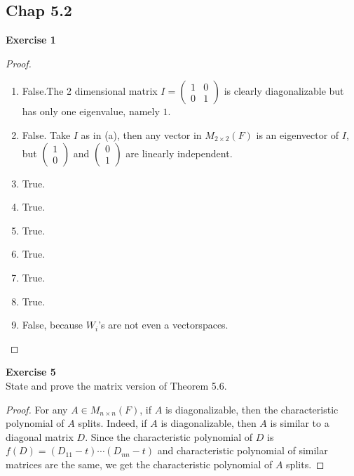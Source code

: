 \documentclass[12pt, a4paper]{article}
\theoremstyle{plain}
\newenvironment{exercise}[2][Exercise]
    { \begin{mdframed}[backgroundcolor=gray!20] \textbf{#1 #2} \\}
    {  \end{mdframed}}
\begin{document}
\pagebreak

\subsection*{Chap 5.2}

\begin{exercise}{1}

\end{exercise}
	\begin{proof}
	\hfill
	
	\begin{enumerate}[label=(\alph*)]
	\item False.The 2 dimensional matrix $I=\begin{pmatrix}
	1&0\\
	0&1
	\end{pmatrix}$ is clearly diagonalizable but has only one eigenvalue, namely $1$.
	
	\item False. Take $I$ as in (a), then any vector in $M_{2\times 2}(F)$ is an eigenvector of $I$, but $\begin{pmatrix}
	1\\
	0
	\end{pmatrix}$ and $\begin{pmatrix}
	0\\
	1
	\end{pmatrix}$ are linearly independent.
	
	\item True.
	
	\item True.
	
	\item True.
	
	\item True.
	
	\item True.
	
	\item True.
	
	\item False, because $W_i$'s are not even a vectorspaces.
	\end{enumerate}
	\end{proof}
	
\begin{exercise}{5}
State and prove the matrix version of Theorem 5.6.
\end{exercise}
	\begin{proof}
	For any $A\in M_{n\times n}(F)$, if $A$ is diagonalizable, then the characteristic polynomial of $A$ splits. Indeed, if $A$ is diagonalizable, then $A$ is similar to a diagonal matrix $D$. Since the characteristic polynomial of $D$ is $f(D)=(D_{11}-t)\cdots(D_{nn}-t)$ and characteristic polynomial of similar matrices are the same, we get the characteristic polynomial of $A$ splits.
	\end{proof}
	
\end{document}
